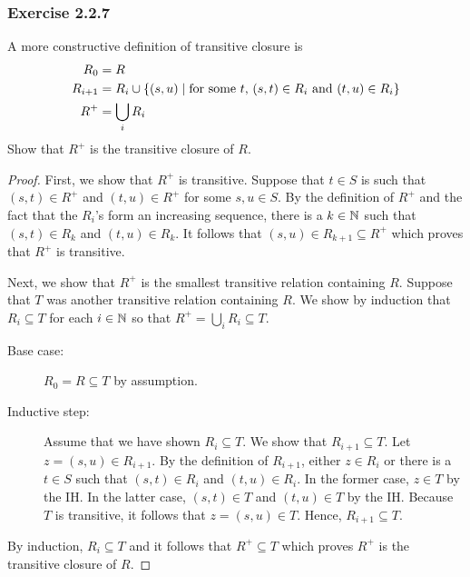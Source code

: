 \subsubsection*{Exercise 2.2.7}
A more constructive definition of transitive closure is
\begin{align*}
    R_0 &= R  \\
    R_{i+1} &= R_i \cup \{(s, u)\mid\text{for some $t$, $(s, t) \in R_i$ and $(t, u) \in R_i$}\} \\
    R^+ &= \bigcup_i R_i
\end{align*}
Show that $R^+$ is the transitive closure of $R$.
\begin{proof}
First, we show that $R^+$ is transitive.  Suppose that $t \in S$ is such that $(s, t) \in R^+$ and $(t, u) \in R^+$ for some $s, u \in S$.  By the definition of $R^+$ and the fact that the $R_i$'s form an increasing sequence, there is a $k \in \mathbb{N}$ such that $(s, t) \in R_k$ and $(t, u) \in R_k$.  It follows that $(s, u) \in R_{k+1} \subseteq R^+$ which proves that $R^+$ is transitive.

Next, we show that $R^+$ is the smallest transitive relation containing $R$.  Suppose that $T$ was another
transitive relation containing $R$.  We show by induction that $R_i \subseteq T$ for each $i \in \mathbb{N}$ so that $R^+ = \bigcup_i R_i \subseteq T$.  
\begin{description}
    \item[Base case:] $R_0 = R \subseteq T$ by assumption.
    \item[Inductive step:] Assume that we have shown $R_i \subseteq T$.  We show that $R_{i+1} \subseteq T$.  Let $z = (s, u) \in R_{i+1}$.  By the definition of $R_{i+1}$, either $z \in R_i$ or there is a 
$t \in S$ such that $(s, t) \in R_i$ and $(t, u) \in R_i$.  In the former case, $z \in T$ by the IH.  In the latter case,
$(s, t) \in T$ and $(t, u) \in T$ by the IH.  Because $T$ is transitive, it follows that $z = (s, u) \in T$.  Hence, $R_{i+1} \subseteq T$.
\end{description}
By induction, $R_i \subseteq T$ and it follows that $R^+ \subseteq T$ which proves $R^+$ is the transitive closure of $R$.
\end{proof}


